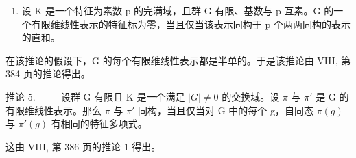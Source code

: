 \begin{enumerate}
\def\labelenumi{\alph{enumi})}
\setcounter{enumi}{1}
\tightlist
\item
  设 K 是一个特征为素数 p 的完满域，且群 G 有限、基数与 p 互素。G 的一个有限维线性表示的特征标为零，当且仅当该表示同构于 p 个两两同构的表示的直和。
\end{enumerate}

在该推论的假设下，G 的每个有限维线性表示都是半单的。于是该推论由 VIII, 第 384 页的推论得出。

推论 5. —— 设群 G 有限且 K 是一个满足 \(|G| \neq 0\) 的交换域。设 \(\pi\) 与 \(\pi'\) 是 G 的有限维线性表示。那么 \(\pi\) 与 \(\pi'\) 同构，当且仅当对 G 中的每个 g，自同态 \(\pi(g)\) 与 \(\pi'(g)\) 有相同的特征多项式。

这由 VIII, 第 386 页的推论 1 得出。

